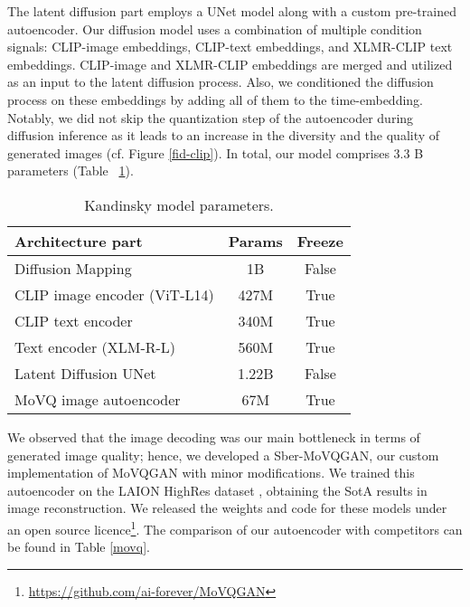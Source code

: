 \documentclass[11pt]{article}
\begin{document}
The latent diffusion part employs a UNet model along with a custom pre-trained autoencoder. Our diffusion model uses a combination of multiple condition signals: CLIP-image embeddings, CLIP-text embeddings, and XLMR-CLIP text embeddings. CLIP-image and XLMR-CLIP embeddings are merged and utilized as an input to the latent diffusion process. Also, we conditioned the diffusion process on these embeddings by adding all of them to the time-embedding. Notably, we did not skip the quantization step of the autoencoder during diffusion inference as it leads to an increase in the diversity and the quality of generated images (cf. Figure \ref{fid-clip}).
In total, our model comprises 3.3 B parameters (Table ~\ref{parameters distribution}).

\begin{table}[h]
\small 
  \caption{Kandinsky model parameters.}
  \centering
  \begin{tabular}{lcc}
    \hline
    \textbf{Architecture part} & \textbf{Params} & \textbf{Freeze} \\
    \hline
     Diffusion Mapping & 1B & False \\
     CLIP image encoder (ViT-L14)& 427M & True \\
     CLIP text encoder & 340M & True \\
     Text encoder (XLM-R-L)& 560M & True \\
     Latent Diffusion UNet & 1.22B & False \\
     MoVQ image autoencoder & 67M & True \\
    
    \hline
  \end{tabular}
  \label{parameters distribution}
\end{table}

We observed that the image decoding was our main bottleneck in terms of generated image quality; hence, we developed a Sber-MoVQGAN, our custom implementation of MoVQGAN \cite{zheng2022movq}  with minor modifications. We trained this autoencoder on the LAION HighRes dataset \cite{DBLP:conf/nips/SchuhmannBVGWCC22}, obtaining the SotA results in image reconstruction. We released  the weights and code for these models under an open source licence\footnote{\url{https://github.com/ai-forever/MoVQGAN}}. The comparison of our autoencoder with competitors can be found in Table \ref{movq}.
\end{document}
